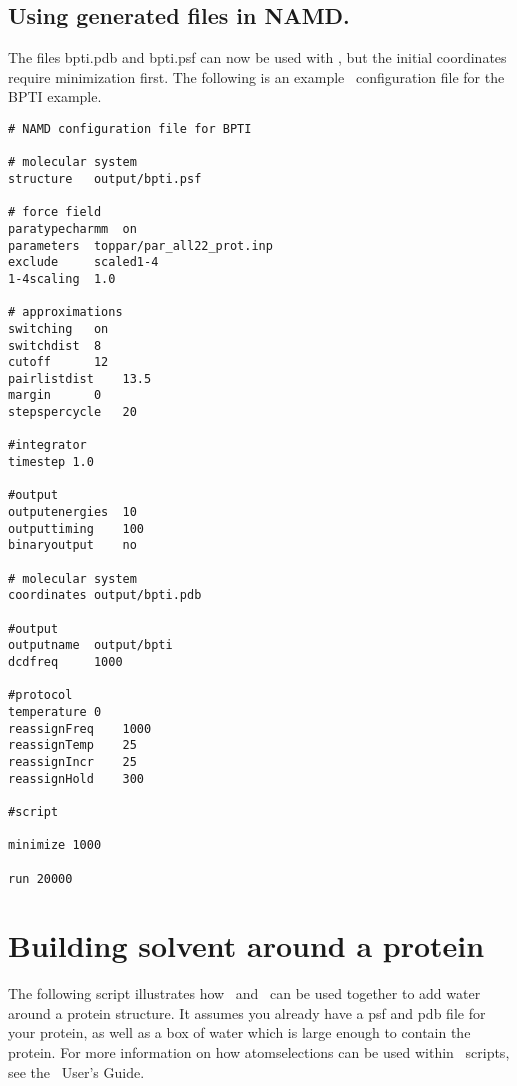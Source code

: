 \subsection*{Using generated files in NAMD.}

The files bpti.pdb and bpti.psf can now be used with \NAMD, but the
initial coordinates require minimization first.
The following is an example \NAMD\ configuration file for the BPTI example.

\begin{verbatim}
# NAMD configuration file for BPTI

# molecular system
structure	output/bpti.psf

# force field
paratypecharmm	on
parameters	toppar/par_all22_prot.inp
exclude		scaled1-4
1-4scaling	1.0

# approximations
switching	on
switchdist	8
cutoff		12
pairlistdist	13.5
margin		0
stepspercycle	20

#integrator
timestep 1.0

#output
outputenergies	10
outputtiming	100
binaryoutput	no

# molecular system
coordinates	output/bpti.pdb

#output
outputname	output/bpti
dcdfreq		1000

#protocol
temperature	0
reassignFreq	1000
reassignTemp	25
reassignIncr	25
reassignHold	300

#script

minimize 1000

run 20000
\end{verbatim}

\section{Building solvent around a protein}
The following script illustrates how \PSFGEN\ and \VMD\ can be used together
to add water around a protein structure.  It assumes you already have a 
psf and pdb file for your protein, as well as a box of water which is 
large enough to contain the protein. For more information on how atomselections
can be used within \VMD\ scripts, see the \VMD\ User's Guide.

